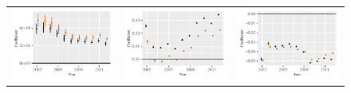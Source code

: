 \documentclass[reqno,onecolumn,letterpaper,12pt]{article}
\begin{document}
\begin{figure}[htp]
\begin{tabular}{@{\hskip -.05cm}c@{\hskip -.2cm}c@{\hskip -.2cm}c}
\includegraphics[height=.165\textheight, clip=true, trim=.5cm .5cm 0cm .1cm]{figures/main_rl_plots/LDV.pdf} &
\includegraphics[height=.165\textheight, clip=true, trim=.5cm .5cm 0cm .1cm]{figures/main_rl_plots/Mass.pdf}    &
\includegraphics[height=.165\textheight, clip=true, trim=.5cm .5cm 0cm .1cm]{figures/main_rl_plots/Distance.pdf}  \\



\end{tabular}
\end{figure}
\end{document}
